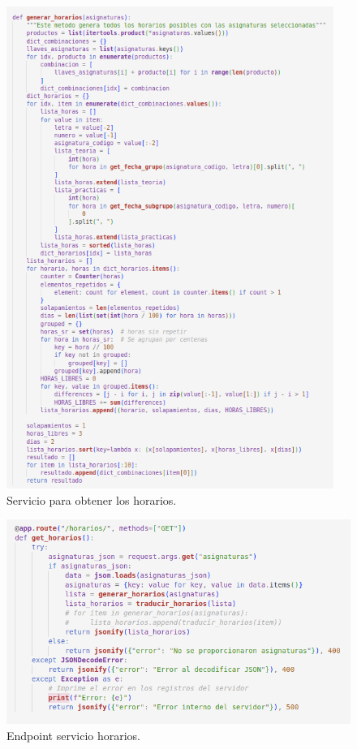 \begin{figure}[H]
    \centering
    \includegraphics[width=0.95\textwidth]{./imagenes/get_horarios.png}
    \caption{Servicio para obtener los horarios.}
    \label{fig:get_horarios}
\end{figure}

\begin{figure}[H]
    \centering
    \includegraphics[width=1\textwidth]{./imagenes/get_horarios_endpoint.png}
    \caption{Endpoint servicio horarios.}
    \label{fig:get_horarios_endpoint}
\end{figure}

